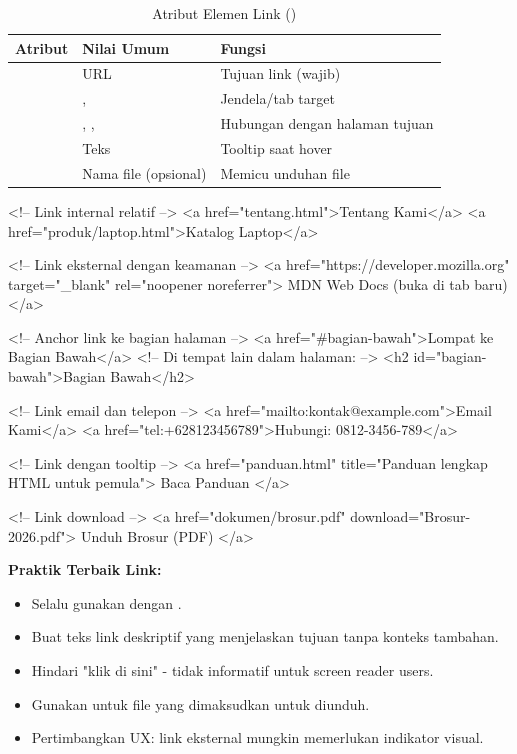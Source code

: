 \begin{table}[H]
\centering
\begin{tabular}{|P{3cm}|P{2.5cm}|P{6cm}|}
\hline
\textbf{Atribut} & \textbf{Nilai Umum} & \textbf{Fungsi} \\
\hline
{} & URL & Tujuan link (wajib) \\
\hline
{} & ,  & Jendela/tab target \\
\hline
{} & , ,  & Hubungan dengan halaman tujuan \\
\hline
{} & Teks & Tooltip saat hover \\
\hline
{} & Nama file (opsional) & Memicu unduhan file \\
\hline
\end{tabular}
\caption{Atribut Elemen Link ()}
\label{tab:link-attributes}
\end{table}

\begin{webcode}[language=HTML, caption={Contoh Berbagai Jenis Link}]
<!-- Link internal relatif -->
<a href="tentang.html">Tentang Kami</a>
<a href="produk/laptop.html">Katalog Laptop</a>

<!-- Link eksternal dengan keamanan -->
<a href="https://developer.mozilla.org" 
   target="_blank" 
   rel="noopener noreferrer">
   MDN Web Docs (buka di tab baru)
</a>

<!-- Anchor link ke bagian halaman -->
<a href="#bagian-bawah">Lompat ke Bagian Bawah</a>
<!-- Di tempat lain dalam halaman: -->
<h2 id="bagian-bawah">Bagian Bawah</h2>

<!-- Link email dan telepon -->
<a href="mailto:kontak@example.com">Email Kami</a>
<a href="tel:+628123456789">Hubungi: 0812-3456-789</a>

<!-- Link dengan tooltip -->
<a href="panduan.html" title="Panduan lengkap HTML untuk pemula">
   Baca Panduan
</a>

<!-- Link download -->
<a href="dokumen/brosur.pdf" download="Brosur-2026.pdf">
   Unduh Brosur (PDF)
</a>
\end{webcode}

\begin{catatan}
\textbf{Praktik Terbaik Link:}
\begin{itemize}[leftmargin=*]
  \item Selalu gunakan  dengan .
  \item Buat teks link deskriptif yang menjelaskan tujuan tanpa konteks tambahan.
  \item Hindari "klik di sini" - tidak informatif untuk screen reader users.
  \item Gunakan  untuk file yang dimaksudkan untuk diunduh.
  \item Pertimbangkan UX: link eksternal mungkin memerlukan indikator visual.
\end{itemize}
\end{catatan}

